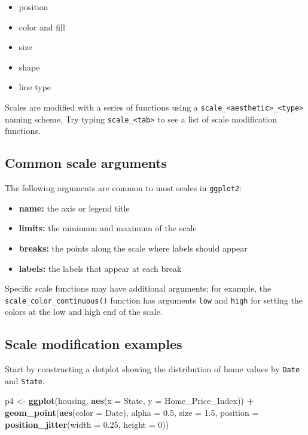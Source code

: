 \documentclass[]{book}
\newenvironment{Shaded}{\begin{snugshade}}{\end{snugshade}}
\newcommand{\KeywordTok}[1]{\textcolor[rgb]{0.13,0.29,0.53}{\textbf{#1}}}
\newcommand{\DataTypeTok}[1]{\textcolor[rgb]{0.13,0.29,0.53}{#1}}
\newcommand{\DecValTok}[1]{\textcolor[rgb]{0.00,0.00,0.81}{#1}}
\newcommand{\FloatTok}[1]{\textcolor[rgb]{0.00,0.00,0.81}{#1}}
\newcommand{\StringTok}[1]{\textcolor[rgb]{0.31,0.60,0.02}{#1}}
\newcommand{\OperatorTok}[1]{\textcolor[rgb]{0.81,0.36,0.00}{\textbf{#1}}}
\newcommand{\NormalTok}[1]{#1}
\providecommand{\tightlist}{%
  \setlength{\itemsep}{0pt}\setlength{\parskip}{0pt}}
\begin{document}
\begin{itemize}
\tightlist
\item
  position
\item
  color and fill
\item
  size
\item
  shape
\item
  line type
\end{itemize}

Scales are modified with a series of functions using a
\texttt{scale\_\textless{}aesthetic\textgreater{}\_\textless{}type\textgreater{}}
naming scheme. Try typing \texttt{scale\_\textless{}tab\textgreater{}}
to see a list of scale modification functions.

\subsection{Common scale arguments}\label{common-scale-arguments}

The following arguments are common to most scales in \texttt{ggplot2}:

\begin{itemize}
\tightlist
\item
  \textbf{name:} the axis or legend title
\item
  \textbf{limits:} the minimum and maximum of the scale
\item
  \textbf{breaks:} the points along the scale where labels should appear
\item
  \textbf{labels:} the labels that appear at each break
\end{itemize}

Specific scale functions may have additional arguments; for example, the
\texttt{scale\_color\_continuous()} function has arguments \texttt{low}
and \texttt{high} for setting the colors at the low and high end of the
scale.

\subsection{Scale modification
examples}\label{scale-modification-examples}

Start by constructing a dotplot showing the distribution of home values
by \texttt{Date} and \texttt{State}.

\begin{Shaded}
\begin{Highlighting}[]
\NormalTok{p4 <-}\StringTok{ }\KeywordTok{ggplot}\NormalTok{(housing, }\KeywordTok{aes}\NormalTok{(}\DataTypeTok{x =}\NormalTok{ State, }\DataTypeTok{y =}\NormalTok{ Home_Price_Index)) }\OperatorTok{+}\StringTok{ }
\StringTok{    }\KeywordTok{geom_point}\NormalTok{(}\KeywordTok{aes}\NormalTok{(}\DataTypeTok{color =}\NormalTok{ Date), }\DataTypeTok{alpha =} \FloatTok{0.5}\NormalTok{, }\DataTypeTok{size =} \FloatTok{1.5}\NormalTok{,}
               \DataTypeTok{position =} \KeywordTok{position_jitter}\NormalTok{(}\DataTypeTok{width =} \FloatTok{0.25}\NormalTok{, }\DataTypeTok{height =} \DecValTok{0}\NormalTok{))}
\end{Highlighting}
\end{Shaded}
\end{document}
